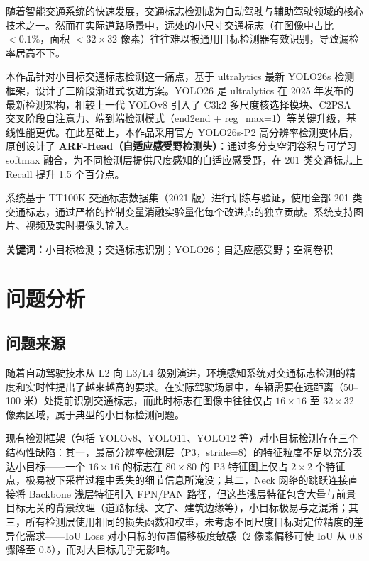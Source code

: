 \documentclass[12pt,a4paper,linespread=1.5,fontset=none]{ctexart}
\begin{document}
随着智能交通系统的快速发展，交通标志检测成为自动驾驶与辅助驾驶领域的核心技术之一。然而在实际道路场景中，远处的小尺寸交通标志（在图像中占比 $< 0.1\%$，面积 $< 32\times 32$ 像素）往往难以被通用目标检测器有效识别，导致漏检率居高不下。

本作品针对小目标交通标志检测这一痛点，基于 ultralytics 最新 YOLO26s 检测框架，设计了三阶段渐进式改进方案。YOLO26 是 ultralytics 在 2025 年发布的最新检测架构，相较上一代 YOLOv8 引入了 C3k2 多尺度核选择模块、C2PSA 交叉阶段自注意力、端到端检测模式（end2end + reg\_max=1）等关键升级，基线性能更优。在此基础上，本作品采用官方 YOLO26s-P2 高分辨率检测变体后，原创设计了 \textbf{ARF-Head（自适应感受野检测头）}：通过多分支空洞卷积与可学习 softmax 融合，为不同检测层提供尺度感知的自适应感受野，在 201 类交通标志上 Recall 提升 1.5 个百分点。

系统基于 TT100K 交通标志数据集（2021 版）进行训练与验证，使用全部 201 类交通标志，通过严格的控制变量消融实验量化每个改进点的独立贡献。系统支持图片、视频及实时摄像头输入。

\textbf{关键词：}小目标检测；交通标志识别；YOLO26；自适应感受野；空洞卷积

\section{问题分析}

\subsection{问题来源}

随着自动驾驶技术从 L2 向 L3/L4 级别演进，环境感知系统对交通标志检测的精度和实时性提出了越来越高的要求。在实际驾驶场景中，车辆需要在远距离（50--100 米）处提前识别交通标志，而此时标志在图像中往往仅占 $16\times 16$ 至 $32\times 32$ 像素区域，属于典型的小目标检测问题。

现有检测框架（包括 YOLOv8、YOLO11、YOLO12 等）对小目标检测存在三个结构性缺陷：其一，最高分辨率检测层（P3，stride=8）的特征粒度不足以充分表达小目标——一个 $16\times 16$ 的标志在 $80\times 80$ 的 P3 特征图上仅占 $2\times 2$ 个特征点，极易被下采样过程中丢失的细节信息所淹没；其二，Neck 网络的跳跃连接直接将 Backbone 浅层特征引入 FPN/PAN 路径，但这些浅层特征包含大量与前景目标无关的背景纹理（道路标线、文字、建筑边缘等），小目标极易与之混淆；其三，所有检测层使用相同的损失函数和权重，未考虑不同尺度目标对定位精度的差异化需求——IoU Loss 对小目标的位置偏移极度敏感（2 像素偏移可使 IoU 从 0.8 骤降至 0.5），而对大目标几乎无影响。
\end{document}
